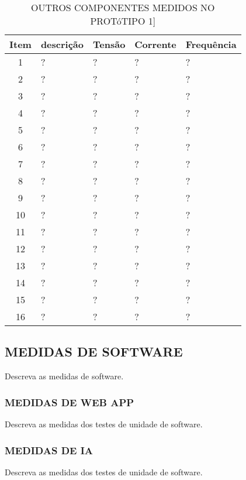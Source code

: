 \begin{table}
	\centering
	\caption{OUTROS COMPONENTES MEDIDOS NO PROTóTIPO 1]}
	\begin{tabular}{ |c | p{3cm}| p{3cm} |p{3cm} | p{3cm} | } \hline
		\textbf{ Item} 	   & \textbf{descrição}	&\textbf{Tensão} &\textbf{Corrente} &\textbf{Frequência} \\ \hline
		1  & ? & ? & ? & ? \\ \hline
		2  & ? & ? & ? & ? \\ \hline
		3  & ? & ? & ? & ? \\ \hline
		4  & ? & ? & ? & ? \\ \hline
		5  & ? & ? & ? & ?\\ \hline
		6  & ? & ? & ? & ?\\ \hline
		7  & ? & ? & ? & ?\\ \hline
		8  & ? & ? & ? & ?\\ \hline
		9  & ? & ? & ? & ?\\ \hline
		10  & ? & ? & ? & ?\\ \hline
		11 & ? & ? & ? & ?\\ \hline
		12 & ? & ? & ? & ?\\ \hline
		13 & ? & ? & ? & ?\\ \hline
		14 & ? & ? & ? & ?\\ \hline
		15 & ? & ? & ? & ?\\ \hline
		16 & ? & ? & ? & ?\\ \hline
		
		
	\end{tabular}					
	
	
	\label{T15}\par
\end{table}



\subsection{MEDIDAS DE SOFTWARE}
Descreva as medidas de software.

\subsubsection{MEDIDAS DE WEB APP}
Descreva as medidas dos testes de unidade de software.

\subsubsection{MEDIDAS DE IA}
Descreva as medidas dos testes de unidade de software.






